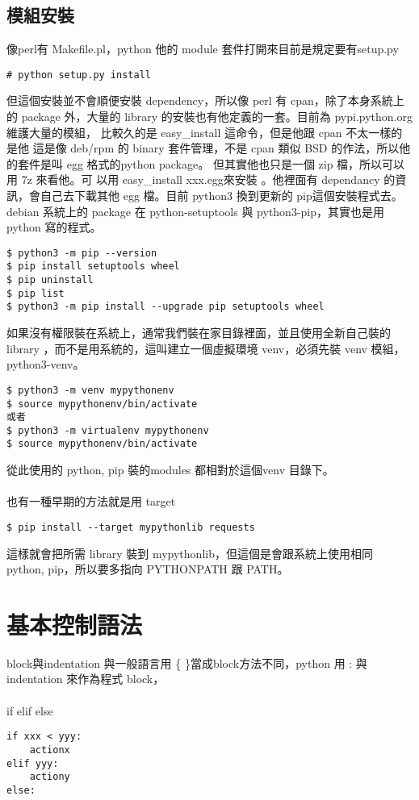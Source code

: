 \subsection{模組安裝}
像perl有 Makefile.pl，python 他的 module 套件打開來目前是規定要有setup.py
\begin{verbatim}
# python setup.py install
\end{verbatim}
但這個安裝並不會順便安裝 dependency，所以像 perl 有 cpan，除了本身系統上的 
package 外，大量的 library 的安裝也有他定義的一套。目前為 pypi.python.org 
維護大量的模組， 比較久的是 easy\_install 這命令，但是他跟 cpan 不太一樣的是他
這是像 deb/rpm 的 binary 套件管理，不是 cpan 類似 BSD 的作法，所以他的套件是叫
egg 格式的python package。 但其實他也只是一個 zip 檔，所以可以用 7z 來看他。可
以用 easy\_install xxx.egg來安裝 。他裡面有 dependancy 的資訊，會自己去下載其他
egg 檔。目前 python3 換到更新的 pip這個安裝程式去。debian 系統上的
package 在 python-setuptools 與 python3-pip，其實也是用 python 寫的程式。
\begin{verbatim}
$ python3 -m pip --version
$ pip install setuptools wheel
$ pip uninstall
$ pip list
$ python3 -m pip install --upgrade pip setuptools wheel
\end{verbatim}
如果沒有權限裝在系統上，通常我們裝在家目錄裡面，並且使用全新自己裝的 library
，而不是用系統的，這叫建立一個虛擬環境 venv，必須先裝 venv 模組，python3-venv。
\begin{verbatim}
$ python3 -m venv mypythonenv
$ source mypythonenv/bin/activate
或者
$ python3 -m virtualenv mypythonenv
$ source mypythonenv/bin/activate
\end{verbatim}
從此使用的 python, pip 裝的modules 都相對於這個venv 目錄下。
\\\\
也有一種早期的方法就是用 target
\begin{verbatim}
$ pip install --target mypythonlib requests
\end{verbatim}
這樣就會把所需 library 裝到 mypythonlib，但這個是會跟系統上使用相同
python, pip，所以要多指向 PYTHONPATH 跟 PATH。

\section{基本控制語法}
block與indentation
與一般語言用 \{ \}當成block方法不同，python 用 : 與 indentation 來作為程式
block，
\\\\
if elif else
\begin{verbatim}
if xxx < yyy:
    actionx
elif yyy:
    actiony
else:
\end{verbatim}

